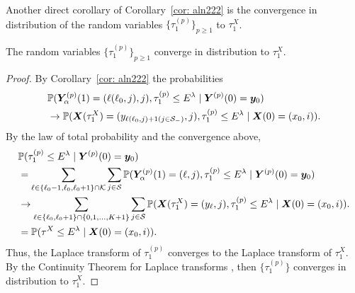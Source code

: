 Another direct corollary of Corollary~\ref{cor: aln222} is the convergence in distribution of the random variables \(\{\tau_1^{(p)}\}_{p\geq 1}\) to \(\tau_1^X\). 
\begin{cor}\label{cor: short cor}
	The random variables \(\{\tau_1^{(p)}\}_{p\geq 1}\) converge in distribution to \(\tau_1^X\). 
\end{cor}
\begin{proof}
	By Corollary~\ref{cor: aln222} the probabilities 
	\begin{align}
		&\mathbb P(\boldsymbol Y_{\alpha}^{(p)}(1) = (\ell(\ell_0,j),j),\tau_1^{(p)}\leq E^\lambda
            	 \mid \boldsymbol Y^{(p)}(0) = \boldsymbol y_0) \nonumber
		\\&\to  
			\mathbb P(\boldsymbol X(\tau_1^X) = (y_{\ell(\ell_0,j)+1(j\in\mathcal{S}_-)}, j),\tau_1^{(p)}\leq E^\lambda \mid \boldsymbol X(0) = (x_0,i)).\nonumber
	\end{align}
	By the law of total probability and the convergence above, 
	\begin{align}
		&\mathbb P( \tau_1^{(p)}\leq E^\lambda
		\mid \boldsymbol Y^{(p)}(0) = \boldsymbol y_0) \nonumber
		\\&=\sum_{\ell\in\{\ell_0-1,\ell_0,\ell_0+1\}\cap\mathcal K}\sum_{j\in\mathcal{S}}\mathbb P(\boldsymbol Y_{\alpha}^{(p)}(1) = (\ell,j),\tau_1^{(p)}\leq E^\lambda
		\mid \boldsymbol Y^{(p)}(0) = \boldsymbol y_0) \nonumber
		\\&\to  
		\sum_{\ell\in\{\ell_0,\ell_0+1\}\cap\{0,1,\dots,K+1\}}\sum_{j\in\mathcal{S}}\mathbb P(\boldsymbol X(\tau_1^X) = (y_{\ell}, j),\tau_1^{(p)}\leq E^\lambda \mid \boldsymbol X(0) = (x_0,i)).\nonumber
		\\&=\mathbb P(\tau^X\leq E^\lambda \mid \boldsymbol X(0) = (x_0,i) ).
	\end{align}
	Thus, the Laplace transform of \(\tau_1^{(p)}\) converges to the Laplace transform of \(\tau_1^X\). By the Continuity Theorem for Laplace transforms \cite[Chapter XIII, Theorem 2a]{feller1957}, then \(\{\tau_1^{(p)}\}\) converges in distribution to \(\tau_1^X\). 
\end{proof}

